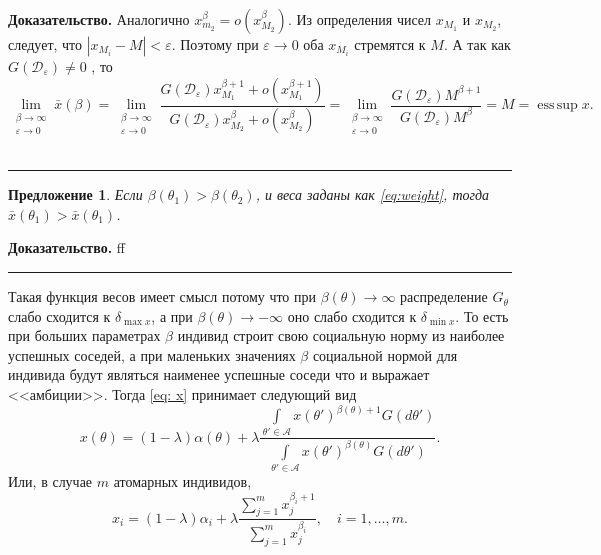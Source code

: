 \documentclass[12pt]{article}
\newtheorem{proposition}{Предложение}
\newenvironment{proof}[1][Доказательство]{\noindent\textbf{#1.} }{\ \rule{0.5em}{0.5em}}
\newcommand\abs[1]{\left\lvert#1\right\rvert}
\DeclareMathOperator*{\esssup}{ess\,sup}
\begin{document}
\begin{proof}
Аналогично $x_{m_2}^\beta = o(x_{M_2}^\beta). $ 
Из определения чисел $x_{M_1}$ и $x_{M_2}$,  следует,  что $\abs{x_{M_i} - M} < \varepsilon$.  Поэтому при $\varepsilon \to 0$ оба $x_{M_i}$ стремятся к $M$. 
А так как $G(\mathcal{D}_\varepsilon) \neq 0$ ,  то
\begin{equation*}
\lim\limits_{\substack{\beta \to \infty \\  \varepsilon \to 0}} \bar{x}(\beta) = 
\lim\limits_{\substack{\beta \to \infty \\  \varepsilon \to 0}} \frac{G(\mathcal{D}_\varepsilon) x_{M_1}^{\beta + 1} + o(x_{M_1}^{\beta+1})}{G(\mathcal{D}_\varepsilon) x_{M_2}^{\beta} + o(x_{M_2}^{\beta})} =
\lim\limits_{\substack{\beta \to \infty \\  \varepsilon \to 0}}  \frac{G(\mathcal{D}_\varepsilon)M^{\beta+1}}{G(\mathcal{D}_\varepsilon)M^{\beta}} = M = \esssup x.
\end{equation*}
\end{proof}

\begin{proposition}
Если $\beta(\theta_1) > \beta(\theta_2)$, и веса заданы как \eqref{eq:weight}, тогда $\bar{x}(\theta_1) > \bar{x}(\theta_1)$.
\end{proposition}
\begin{proof}
ff
\end{proof}

Такая функция весов имеет смысл потому что при $\beta(\theta) \rightarrow \infty$ распределение $G_\theta$ слабо сходится к $\delta_{\max x}$,  а при $\beta(\theta) \rightarrow -\infty$ оно слабо сходится к $\delta_{\min x}$.  
То есть при больших параметрах $\beta$ индивид строит свою социальную норму из наиболее успешных соседей,  а при маленьких значениях $\beta$ социальной нормой для индивида будут являться наименее успешные соседи что и выражает <<амбиции>>.
Тогда \eqref{eq: x} принимает следующий вид
$$
x(\theta) = (1-\lambda)\alpha(\theta) + \lambda \frac{\int\limits_{\theta' \in \mathcal{A}} x(\theta')^{\beta(\theta) + 1} G(d \theta')}{\int\limits_{\theta' \in \mathcal{A}} x(\theta')^{\beta(\theta)}G(d \theta')}.
$$
Или,  в случае $m$ атомарных индивидов,
$$
x_i = (1-\lambda) \alpha_i + \lambda \frac{\sum\limits_{j=1}^m x_j^{\beta_i+1}}{\sum\limits_{j=1}^m x_j^{\beta_i}}, \quad i = 1,\dots , m.
$$
\end{document}
